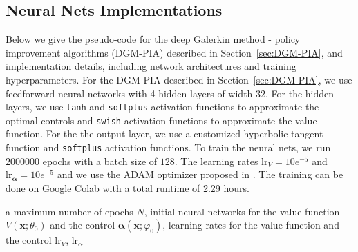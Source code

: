 \documentclass[12pt]{article}
\newcommand{\jh}[1]{\textcolor{purple}{\textsf{[JH: #1]}}}
\begin{document}
\begin{appendices}

\section{Neural Nets Implementations}


Below we give the pseudo-code for the deep Galerkin method - policy improvement algorithms (DGM-PIA) described in Section~\ref{sec:DGM-PIA}, and implementation details, including network architectures and training hyperparameters. For the DGM-PIA described in Section~\ref{sec:DGM-PIA}, we use feedforward neural networks with 4 hidden layers of width 32. For the hidden layers, we use \texttt{tanh} and \texttt{softplus} activation functions to approximate the optimal controls and \texttt{swish} activation functions to approximate the value function. For the the output layer, we use a customized hyperbolic tangent function and \texttt{softplus} activation functions. To train the neural nets, we run $2000000$ epochs with a batch size of $128$. The learning rates $\mathrm{lr}_V = 10e^{-5}$ and $\mathrm{lr}_{\bm \alpha} = 10e^{-5}$ and we use the ADAM optimizer proposed in \cite{kingma2014adam}. The training can be done on Google Colab with a total runtime of 2.29 hours. 






\begin{algorithm}
    \caption{The DGM-PIA algorithm for solving the generic HJB \eqref{eq:HJB_generic}}
  \begin{algorithmic}[1]
  \Require a maximum number of epochs $N$, initial neural networks for the value function $V(\bm x; \theta_0)$ and the control $\bm\alpha(\bm x; \varphi_0)$, learning rates for the value function and the control $\mathrm{lr}_V$, $\mathrm{lr}_{\bm\alpha}$
        

\end{algorithmic}
\end{algorithm}
\end{appendices}
\end{document}
